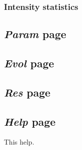 \documentclass{article}
\begin{document}
\subsubsection{Intensity statistics}

\subsection{\emph{Param} page}

\subsection{\emph{Evol} page}

\subsection{\emph{Res} page}

\subsection{\emph{Help} page}
This help.



\end{document}
